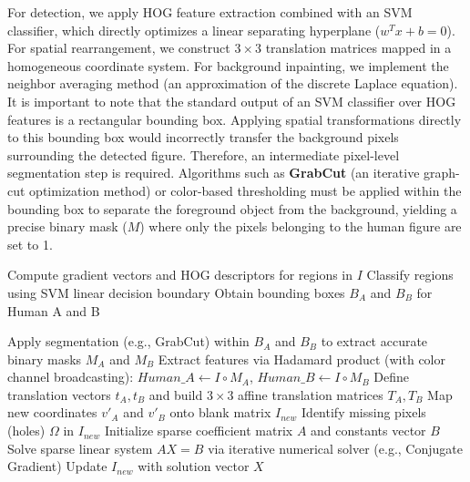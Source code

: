 \documentclass[12pt]{article}
\begin{document}
For detection, we apply HOG feature extraction combined with an SVM classifier, which directly optimizes a linear separating hyperplane ($w^T x + b = 0$). For spatial rearrangement, we construct $3 \times 3$ translation matrices mapped in a homogeneous coordinate system. For background inpainting, we implement the neighbor averaging method (an approximation of the discrete Laplace equation).
It is important to note that the standard output of an SVM classifier over HOG features is a rectangular bounding box. Applying spatial transformations directly to this bounding box would incorrectly transfer the background pixels surrounding the detected figure. Therefore, an intermediate pixel-level segmentation step is required. Algorithms such as \textbf{GrabCut} (an iterative graph-cut optimization method) or color-based thresholding must be applied within the bounding box to separate the foreground object from the background, yielding a precise binary mask ($M$) where only the pixels belonging to the human figure are set to 1.


\begin{algorithm}[H]
\caption{Image Composition and Spatial Rearrangement}
\SetAlgoLined
{}
 Compute gradient vectors and HOG descriptors for regions in $I$\;
 Classify regions using SVM linear decision boundary\;
 Obtain bounding boxes $B_A$ and $B_B$ for Human A and B\;
 
 Apply segmentation (e.g., GrabCut) within $B_A$ and $B_B$ to extract accurate binary masks $M_A$ and $M_B$\;
 Extract features via Hadamard product (with color channel broadcasting): $Human\_A \gets I \circ M_A$, $Human\_B \gets I \circ M_B$\;
 Define translation vectors $t_A, t_B$ and build $3 \times 3$ affine translation matrices $T_A, T_B$\;
 Map new coordinates $v'_A$ and $v'_B$ onto blank matrix $I_{new}$\;
 Identify missing pixels (holes) $\Omega$ in $I_{new}$\;
 Initialize sparse coefficient matrix $A$ and constants vector $B$\;
 Solve sparse linear system $AX = B$ via iterative numerical solver (e.g., Conjugate Gradient)\;
 Update $I_{new}$ with solution vector $X$\;
\end{algorithm}
\end{document}

